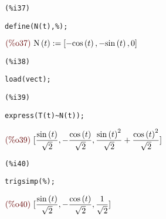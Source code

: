 \documentclass[12pt]{article}
\begin{document}
\noindent
\begin{minipage}[t]{8ex}{\color{red}\bf
\begin{verbatim}
(%i37) 
\end{verbatim}}
\end{minipage}
\begin{minipage}[t]{\textwidth}{\color{blue}
\begin{verbatim}
define(N(t),%);
\end{verbatim}}
\end{minipage}
\begin{math}\displaystyle
\parbox{8ex}{\color{labelcolor}(\%o37) }
\mathrm{N}\left( t\right) :=[-\mathrm{cos}\left( t\right) ,-\mathrm{sin}\left( t\right) ,0]
\end{math}

\noindent
\begin{minipage}[t]{8ex}{\color{red}\bf
\begin{verbatim}
(%i38) 
\end{verbatim}}
\end{minipage}
\begin{minipage}[t]{\textwidth}{\color{blue}
\begin{verbatim}
load(vect);
\end{verbatim}}
\end{minipage}

\noindent
\begin{minipage}[t]{8ex}{\color{red}\bf
\begin{verbatim}
(%i39) 
\end{verbatim}}
\end{minipage}
\begin{minipage}[t]{\textwidth}{\color{blue}
\begin{verbatim}
express(T(t)~N(t));
\end{verbatim}}
\end{minipage}
\begin{math}\displaystyle
\parbox{8ex}{\color{labelcolor}(\%o39) }
[\frac{\mathrm{sin}\left( t\right) }{\sqrt{2}},-\frac{\mathrm{cos}\left( t\right) }{\sqrt{2}},\frac{{\mathrm{sin}\left( t\right) }^{2}}{\sqrt{2}}+\frac{{\mathrm{cos}\left( t\right) }^{2}}{\sqrt{2}}]
\end{math}

\noindent
\begin{minipage}[t]{8ex}{\color{red}\bf
\begin{verbatim}
(%i40) 
\end{verbatim}}
\end{minipage}
\begin{minipage}[t]{\textwidth}{\color{blue}
\begin{verbatim}
trigsimp(%);
\end{verbatim}}
\end{minipage}
\begin{math}\displaystyle
\parbox{8ex}{\color{labelcolor}(\%o40) }
[\frac{\mathrm{sin}\left( t\right) }{\sqrt{2}},-\frac{\mathrm{cos}\left( t\right) }{\sqrt{2}},\frac{1}{\sqrt{2}}]
\end{math}
\end{document}
